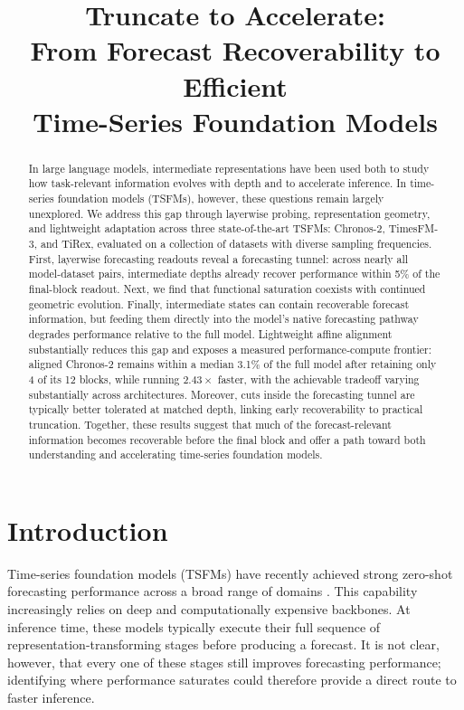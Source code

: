 \documentclass{article} %
\title{Truncate to Accelerate: 
\\From Forecast Recoverability to Efficient \\Time-Series Foundation Models}
\begin{document}
\maketitle
\begin{abstract}
In large language models, intermediate representations have been used both to study how task-relevant information evolves with depth and to accelerate inference. In time-series foundation models (TSFMs), however, these questions remain largely unexplored. We address this gap through layerwise probing, representation geometry, and lightweight adaptation across three state-of-the-art TSFMs: Chronos-2, TimesFM-3, and TiRex, evaluated on a collection of datasets with diverse sampling frequencies. First, layerwise forecasting readouts reveal a forecasting tunnel: across nearly all model-dataset pairs, intermediate depths already recover performance within 5\% of the final-block readout. Next, we find that functional saturation coexists with continued geometric evolution. Finally, intermediate states can contain recoverable forecast information, but feeding them directly into the model's native forecasting pathway degrades performance relative to the full model. Lightweight affine alignment substantially reduces this gap and exposes a measured performance-compute frontier: aligned Chronos-2 remains within a median 3.1\% of the full model after retaining only 4 of its 12 blocks, while running $2.43\times$ faster, with the achievable tradeoff varying substantially across architectures. Moreover, cuts inside the forecasting tunnel are typically better tolerated at matched depth, linking early recoverability to practical truncation. Together, these results suggest that much of the forecast-relevant information becomes recoverable before the final block and offer a path toward both understanding and accelerating time-series foundation models.
\end{abstract}


\section{Introduction}
\label{sec:introduction}

Time-series foundation models (TSFMs) have recently achieved strong zero-shot forecasting performance across a broad range of domains
\citep{ansari2024chronoslearninglanguagetime,
das2024decoderonlyfoundationmodeltimeseries,
woo2024unifiedtraininguniversaltime,
ansari2025chronos2univariateuniversalforecasting,
auer2025tirexzeroshotforecastinglong}.
This capability increasingly relies on deep and computationally expensive backbones. At inference time, these models typically execute their full sequence of representation-transforming stages before producing a forecast. It is not clear, however, that every one of these stages still improves forecasting performance; identifying where performance saturates could therefore provide a direct route to faster inference.
\end{document}
